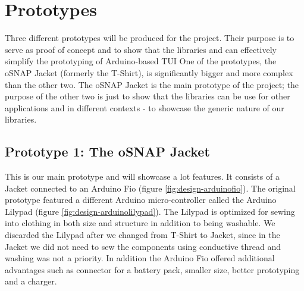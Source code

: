 \section{Prototypes}
\label{sec:prototypes}
Three different prototypes will be produced for the project. Their purpose is to serve as proof of concept and
to show that the libraries and can effectively simplify the prototyping of Arduino-based TUI
One of the prototypes, the oSNAP Jacket (formerly the T-Shirt), is significantly bigger and more complex than the other two.
The oSNAP Jacket is the main prototype of the project; the purpose of the other two
is just to show that the libraries can be use for other applications and in different contexts - to showcase the generic nature of our libraries.

\subsection{Prototype 1: The oSNAP Jacket}
This is our main prototype and will showcase a lot features.
It consists of a Jacket connected to an Arduino Fio (figure \ref{fig:design-arduinofio}). The original prototype featured a different
Arduino micro-controller called the Arduino Lilypad (figure \ref{fig:design-arduinolilypad}). The Lilypad is optimized for sewing into 
clothing in both size and structure in addition to being washable. We discarded the Lilypad after we changed from T-Shirt to Jacket,
since in the Jacket we did not need to sew the components using conductive thread and washing was not a priority. In addition the 
Arduino Fio offered additional advantages such as connector for a battery pack, smaller size, better prototyping and a charger.

